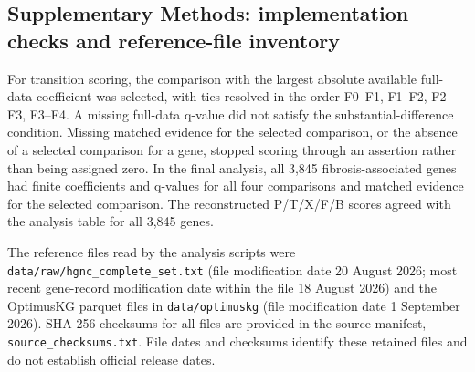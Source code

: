 \documentclass[11pt,a4paper]{article}
\begin{document}
\subsection*{Supplementary Methods: implementation checks and reference-file inventory}
For transition scoring, the comparison with the largest absolute available full-data coefficient was selected, with ties resolved in the order F0--F1, F1--F2, F2--F3, F3--F4. A missing full-data q-value did not satisfy the substantial-difference condition. Missing matched evidence for the selected comparison, or the absence of a selected comparison for a gene, stopped scoring through an assertion rather than being assigned zero. In the final analysis, all 3,845 fibrosis-associated genes had finite coefficients and q-values for all four comparisons and matched evidence for the selected comparison. The reconstructed P/T/X/F/B scores agreed with the analysis table for all 3,845 genes.

The reference files read by the analysis scripts were \nolinkurl{data/raw/hgnc_complete_set.txt} (file modification date 20 August 2026; most recent gene-record modification date within the file 18 August 2026) and the OptimusKG parquet files in \nolinkurl{data/optimuskg} (file modification date 1 September 2026). SHA-256 checksums for all files are provided in the source manifest, \nolinkurl{source_checksums.txt}. File dates and checksums identify these retained files and do not establish official release dates.
\end{document}
